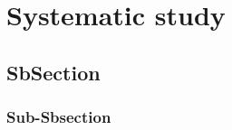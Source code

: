 \newpage
\section{Systematic study}
\label{sec:Section05}

\subsection{SbSection}
\label{sec:Section0x.a-}

\subsubsection{Sub-Sbsection}